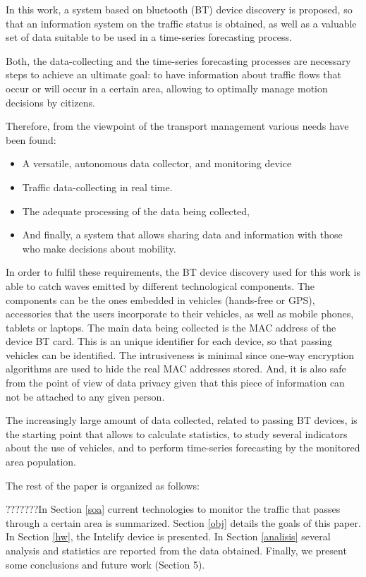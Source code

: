 \documentclass[preprint,authoryear,12pt]{elsarticle}
\begin{document}
In this work, a system based on bluetooth (BT) device discovery is proposed, so that an information system on the traffic status is obtained, as well as a valuable set of data suitable to be used in a time-series forecasting process.

Both, the data-collecting and the time-series forecasting processes are necessary steps to achieve an ultimate goal: to have information about traffic flows that occur or will occur in a certain area, allowing to optimally manage motion decisions by citizens.

Therefore, from the viewpoint of the transport management various needs have been found:

\begin{itemize}
  \item A versatile, autonomous data collector, and monitoring device
  \item Traffic data-collecting in real time.
  \item The adequate processing of the data being collected,
  \item And finally, a system that allows sharing data and information with those who make decisions about mobility.
\end{itemize}

In order to fulfil these requirements, the BT device discovery used for this work is able to catch waves emitted by different technological components. The components can be the ones embedded in vehicles (hands-free or GPS), accessories that the users incorporate to their vehicles, as well as mobile phones, tablets or laptops.
The main data being collected is the MAC address of the device BT card.
This is an unique identifier for each device, so that passing vehicles can be identified.
The intrusiveness is minimal since one-way encryption algorithms are used to hide the real MAC addresses stored. And, it is also safe from the point of view of data privacy given that this piece of information can not be attached to any given person.

The increasingly large amount of data collected, related to passing BT devices, is the starting point that allows to calculate statistics, to study several indicators about the use of vehicles, and to perform time-series forecasting by the monitored area population.

The rest of the paper is organized as follows:

???????In Section \ref{soa} current technologies to monitor the traffic that passes through a certain area is summarized.
Section \ref{obj} details the goals of this paper.
In Section \ref{hw}, the Intelify device is presented.
In Section \ref{analisis} several analysis and statistics are reported from the data obtained.
Finally, we present some conclusions and future work (Section 5).
\end{document}

